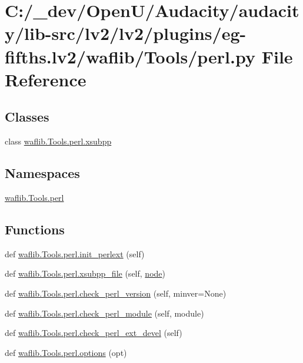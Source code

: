 \hypertarget{lv2_2plugins_2eg-fifths_8lv2_2waflib_2_tools_2perl_8py}{}\section{C\+:/\+\_\+dev/\+Open\+U/\+Audacity/audacity/lib-\/src/lv2/lv2/plugins/eg-\/fifths.lv2/waflib/\+Tools/perl.py File Reference}
\label{lv2_2plugins_2eg-fifths_8lv2_2waflib_2_tools_2perl_8py}
\subsection*{Classes}
\begin{DoxyCompactItemize}
\item 
class \hyperlink{classwaflib_1_1_tools_1_1perl_1_1xsubpp}{waflib.\+Tools.\+perl.\+xsubpp}
\end{DoxyCompactItemize}
\subsection*{Namespaces}
\begin{DoxyCompactItemize}
\item 
 \hyperlink{namespacewaflib_1_1_tools_1_1perl}{waflib.\+Tools.\+perl}
\end{DoxyCompactItemize}
\subsection*{Functions}
\begin{DoxyCompactItemize}
\item 
def \hyperlink{namespacewaflib_1_1_tools_1_1perl_ad690c9b4e0627683b8d8eb680a42daf8}{waflib.\+Tools.\+perl.\+init\+\_\+perlext} (self)
\item 
def \hyperlink{namespacewaflib_1_1_tools_1_1perl_ad98847198592a78a56515c15f095334e}{waflib.\+Tools.\+perl.\+xsubpp\+\_\+file} (self, \hyperlink{structnode}{node})
\item 
def \hyperlink{namespacewaflib_1_1_tools_1_1perl_ac466c27b926b7d70a6643f8d055f62f6}{waflib.\+Tools.\+perl.\+check\+\_\+perl\+\_\+version} (self, minver=None)
\item 
def \hyperlink{namespacewaflib_1_1_tools_1_1perl_a96349a7aa3669ed96474a23459e98246}{waflib.\+Tools.\+perl.\+check\+\_\+perl\+\_\+module} (self, module)
\item 
def \hyperlink{namespacewaflib_1_1_tools_1_1perl_ae2effbe87451eba35dd7aa8cfa8d6b1a}{waflib.\+Tools.\+perl.\+check\+\_\+perl\+\_\+ext\+\_\+devel} (self)
\item 
def \hyperlink{namespacewaflib_1_1_tools_1_1perl_af58a6392e1e27cd335c892a619206093}{waflib.\+Tools.\+perl.\+options} (opt)
\end{DoxyCompactItemize}
